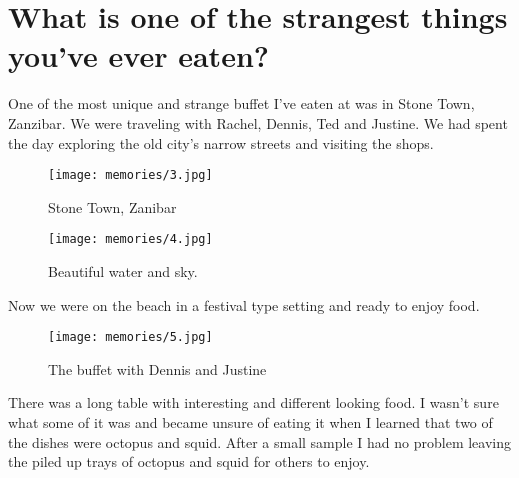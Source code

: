 \section{What is one of the strangest things you've ever eaten?}
One of the most unique and strange buffet I've eaten at was in Stone Town, Zanzibar.
We were traveling with Rachel, Dennis, Ted and Justine.
We had spent the day exploring the old city's narrow streets and visiting the shops.

\begin{figure}
\centering
\texttt{[image: memories/3.jpg]}
\caption{
Stone Town, Zanibar
}
\end{figure}

\begin{figure}
\centering
\texttt{[image: memories/4.jpg]}
\caption{
Beautiful water and sky.
}
\end{figure}

Now we were on the beach in a festival type setting and ready to enjoy food.
\begin{figure}
\centering
\texttt{[image: memories/5.jpg]}
\caption{
The buffet with Dennis and Justine
}
\end{figure}
There was a long table with interesting and different looking food.
I wasn't sure what some of it was and became unsure of eating it when I learned that two of the dishes were octopus and squid.
After a small sample I had no problem leaving the piled up trays of octopus and squid for others to enjoy.

